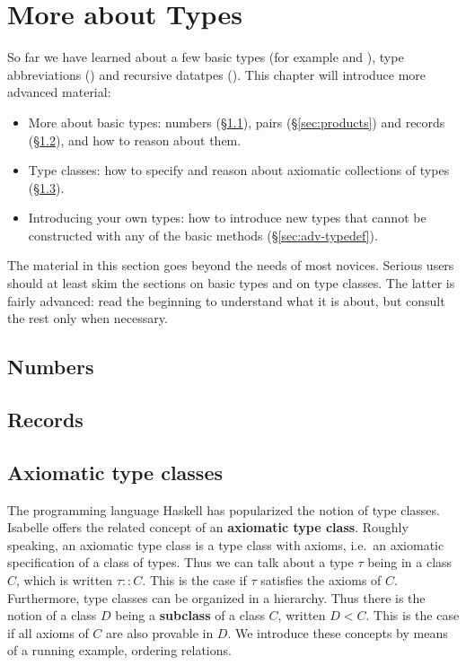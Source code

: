 \chapter{More about Types}
\label{ch:more-types}

So far we have learned about a few basic types (for example  and
), type abbreviations () and recursive datatpes
(). This chapter will introduce more
advanced material:
\begin{itemize}
\item More about basic types: numbers ({\S}\ref{sec:numbers}), pairs
  ({\S}\ref{sec:products}) and records ({\S}\ref{sec:records}), and how to
  reason about them.
\item Type classes: how to specify and reason about axiomatic collections of
  types ({\S}\ref{sec:axclass}).
\item Introducing your own types: how to introduce new types that
  cannot be constructed with any of the basic methods
  ({\S}\ref{sec:adv-typedef}).
\end{itemize}

The material in this section goes beyond the needs of most novices.  Serious
users should at least skim the sections on basic types and on type classes.
The latter is fairly advanced: read the beginning to understand what it is
about, but consult the rest only when necessary.

\section{Numbers}
\label{sec:numbers}





\section{Records}
\label{sec:records}

\section{Axiomatic type classes}
\label{sec:axclass}


The programming language Haskell has popularized the notion of type classes.
Isabelle offers the related concept of an \textbf{axiomatic type class}.
Roughly speaking, an axiomatic type class is a type class with axioms, i.e.\ 
an axiomatic specification of a class of types. Thus we can talk about a type
$\tau$ being in a class $C$, which is written $\tau :: C$.  This is the case if
$\tau$ satisfies the axioms of $C$. Furthermore, type classes can be
organized in a hierarchy. Thus there is the notion of a class $D$ being a
\textbf{subclass} of a class $C$, written $D < C$. This is the case if all
axioms of $C$ are also provable in $D$. We introduce these concepts
by means of a running example, ordering relations.

